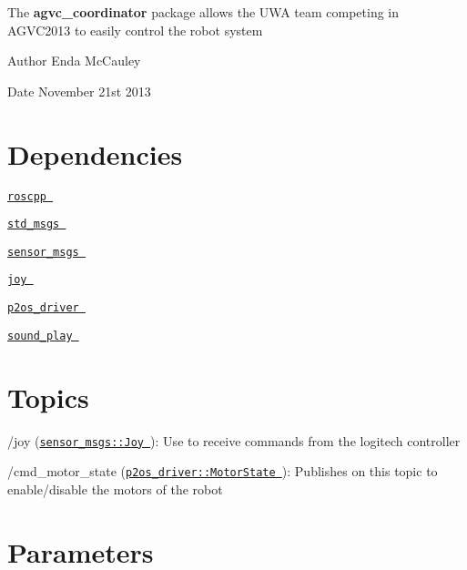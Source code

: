 \-The {\bfseries agvc\-\_\-coordinator} package allows the \-U\-W\-A team competing in \-A\-G\-V\-C2013 to easily control the robot system \par
 \par
 \begin{DoxyAuthor}{\-Author}
\-Enda \-Mc\-Cauley 
\end{DoxyAuthor}
\begin{DoxyDate}{\-Date}
\-November 21st 2013
\end{DoxyDate}
\hypertarget{index_dependencies}{}\section{\-Dependencies}\label{index_dependencies}

\begin{DoxyItemize}
\item {\ttfamily } \href{http://wiki.ros.org/roscpp}{\tt roscpp }
\item {\ttfamily } \href{http://wiki.ros.org/std_msgs}{\tt std\-\_\-msgs }
\item {\ttfamily } \href{http://wiki.ros.org/sensor_msgs}{\tt sensor\-\_\-msgs }
\item {\ttfamily } \href{http://wiki.ros.org/joy}{\tt joy }
\item {\ttfamily } \href{http://wiki.ros.org/p2os_driver?distro=groovy}{\tt p2os\-\_\-driver }
\item {\ttfamily } \href{http://wiki.ros.org/sound_play}{\tt sound\-\_\-play }
\end{DoxyItemize}\hypertarget{index_tops}{}\section{\-Topics}\label{index_tops}

\begin{DoxyItemize}
\item {\ttfamily /joy} (\href{http://docs.ros.org/api/sensor_msgs/html/msg/Joy.html}{\tt sensor\-\_\-msgs\-::\-Joy })\-: \-Use to receive commands from the logitech controller
\item {\ttfamily /cmd\-\_\-motor\-\_\-state} (\href{http://docs.ros.org/diamondback/api/p2os_driver/html/msg/MotorState.html}{\tt p2os\-\_\-driver\-::\-Motor\-State })\-: \-Publishes on this topic to enable/disable the motors of the robot
\end{DoxyItemize}\hypertarget{index_param}{}\section{\-Parameters}\label{index_param}


